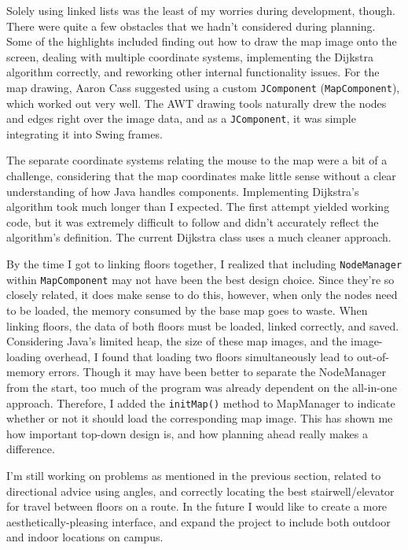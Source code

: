 \documentclass[12pt,letterpaper,titlepage]{article}   %
\begin{document}
Solely using linked lists was the least of my worries during
development, though. There were quite a few obstacles that we hadn't
considered during planning. Some of the highlights included finding out
how to draw the map image onto the screen, dealing with multiple
coordinate systems, implementing the Dijkstra algorithm correctly, and
reworking other internal functionality issues. For the map drawing,
Aaron Cass suggested using a custom \texttt{JComponent}
(\texttt{MapComponent}), which worked out very well. The AWT 
drawing tools naturally drew the nodes and
edges right over the image data, and as a \texttt{JComponent}, it was simple
integrating it into Swing frames.

The separate coordinate systems relating the mouse to the map were a bit
of a challenge, considering that the map coordinates make little sense
without a clear understanding of how Java handles components.
Implementing Dijkstra's algorithm took much longer than I expected. The
first attempt yielded working code, but it was extremely difficult to
follow and didn't accurately reflect the algorithm's definition. The
current Dijkstra class uses a much cleaner approach.

By the time I got to linking floors together, I realized that including
\texttt{NodeManager} within \texttt{MapComponent} may not have been the
best design choice. Since they're so closely related, it does make
sense to do this, however, when only the nodes need to be loaded,
the memory consumed by the base map goes to waste. When linking floors,
the data of both floors must be loaded, linked correctly, and saved.
Considering Java's limited
heap, the size of these map images, and the image-loading overhead, I
found that loading two floors simultaneously lead to out-of-memory
errors. Though it may have been better to separate the NodeManager from
the start, too much of the program was already dependent on the
all-in-one approach. Therefore, I added the \texttt{initMap()} method to
MapManager to indicate whether or not it should load the corresponding
map image. This has shown me how important top-down design is, and how
planning ahead really makes a difference. 

I'm still working on problems as mentioned in the previous section,
related to directional advice using angles, and correctly locating the
best stairwell/elevator for travel between floors on a route. In the
future I would like to create a more aesthetically-pleasing interface,
and expand the project to include both outdoor and indoor locations on
campus.
\end{document}
